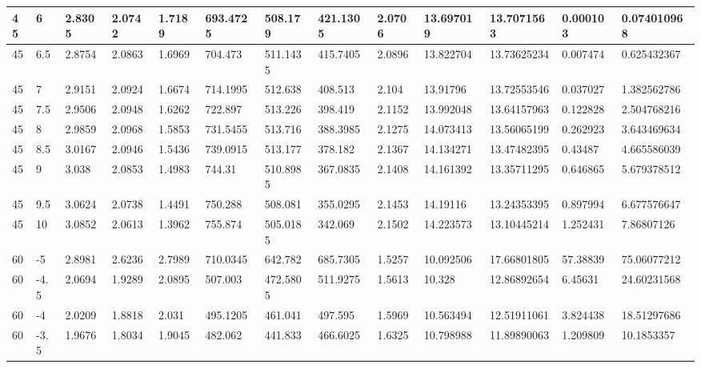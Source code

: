 \begin{longtable}{|l|l|l|l|l|l|l|l|l|l|l|l|l|}
45    & 6     & 2.8305  & 2.0742  & 1.7189  & 693.4725 & 508.179  & 421.1305 & 2.0706   & 13.697019   & 13.7071563     & 0.000103                 & 0.074010968 \\ \hline
45    & 6.5   & 2.8754  & 2.0863  & 1.6969  & 704.473  & 511.1435 & 415.7405 & 2.0896   & 13.822704   & 13.73625234    & 0.007474                 & 0.625432367 \\ \hline
45    & 7     & 2.9151  & 2.0924  & 1.6674  & 714.1995 & 512.638  & 408.513  & 2.104    & 13.91796    & 13.72553546    & 0.037027                 & 1.382562786 \\ \hline
45    & 7.5   & 2.9506  & 2.0948  & 1.6262  & 722.897  & 513.226  & 398.419  & 2.1152   & 13.992048   & 13.64157963    & 0.122828                 & 2.504768216 \\ \hline
45    & 8     & 2.9859  & 2.0968  & 1.5853  & 731.5455 & 513.716  & 388.3985 & 2.1275   & 14.073413   & 13.56065199    & 0.262923                 & 3.643469634 \\ \hline
45    & 8.5   & 3.0167  & 2.0946  & 1.5436  & 739.0915 & 513.177  & 378.182  & 2.1367   & 14.134271   & 13.47482395    & 0.43487                  & 4.665586039 \\ \hline
45    & 9     & 3.038   & 2.0853  & 1.4983  & 744.31   & 510.8985 & 367.0835 & 2.1408   & 14.161392   & 13.35711295    & 0.646865                 & 5.679378512 \\ \hline
45    & 9.5   & 3.0624  & 2.0738  & 1.4491  & 750.288  & 508.081  & 355.0295 & 2.1453   & 14.19116    & 13.24353395    & 0.897994                 & 6.677576647 \\ \hline
45    & 10    & 3.0852  & 2.0613  & 1.3962  & 755.874  & 505.0185 & 342.069  & 2.1502   & 14.223573   & 13.10445214    & 1.252431                 & 7.86807126  \\ \hline
60    & -5    & 2.8981  & 2.6236  & 2.7989  & 710.0345 & 642.782  & 685.7305 & 1.5257   & 10.092506   & 17.66801805    & 57.38839                 & 75.06077212 \\ \hline
60    & -4.5  & 2.0694  & 1.9289  & 2.0895  & 507.003  & 472.5805 & 511.9275 & 1.5613   & 10.328      & 12.86892654    & 6.45631                  & 24.60231568 \\ \hline
60    & -4    & 2.0209  & 1.8818  & 2.031   & 495.1205 & 461.041  & 497.595  & 1.5969   & 10.563494   & 12.51911061    & 3.824438                 & 18.51297686 \\ \hline
60    & -3.5  & 1.9676  & 1.8034  & 1.9045  & 482.062  & 441.833  & 466.6025 & 1.6325   & 10.798988   & 11.89890063    & 1.209809                 & 10.1853357  \\ \hline

\end{longtable}
